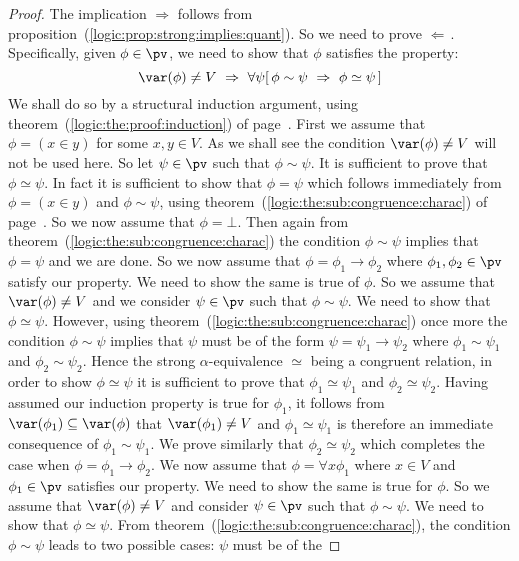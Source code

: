 \noindent
\begin{proof}
The implication $\Rightarrow$ follows from
proposition~(\ref{logic:prop:strong:implies:quant}). So we need to
prove $\Leftarrow$\,. Specifically, given $\phi\in\pv$, we need to
show that $\phi$ satisfies the property:
    \[
    \var(\phi)\neq V\ \Rightarrow\ \forall\psi[\,\phi\sim\psi\
    \Rightarrow\ \phi\simeq\psi\,]
    \]
We shall do so by a structural induction argument, using
theorem~(\ref{logic:the:proof:induction}) of
page~\pageref{logic:the:proof:induction}. First we assume that
$\phi=(x\in y)$ for some $x,y\in V$. As we shall see the condition
$\var(\phi)\neq V$ will not be used here. So let $\psi\in\pv$ such
that $\phi\sim\psi$. It is sufficient to prove that
$\phi\simeq\psi$. In fact it is sufficient to show that $\phi=\psi$
which follows immediately from $\phi=(x\in y)$ and $\phi\sim\psi$,
using theorem~(\ref{logic:the:sub:congruence:charac}) of
page~\pageref{logic:the:sub:congruence:charac}. So we now assume
that $\phi=\bot$. Then again from
theorem~(\ref{logic:the:sub:congruence:charac}) the condition
$\phi\sim\psi$ implies that $\phi=\psi$ and we are done. So we now
assume that $\phi=\phi_{1}\to\phi_{2}$ where
$\phi_{1},\phi_{2}\in\pv$ satisfy our property. We need to show the
same is true of $\phi$. So we assume that $\var(\phi)\neq V$ and we
consider $\psi\in\pv$ such that $\phi\sim\psi$. We need to show that
$\phi\simeq\psi$. However, using
theorem~(\ref{logic:the:sub:congruence:charac}) once more the
condition $\phi\sim\psi$ implies that $\psi$ must be of the form
$\psi=\psi_{1}\to\psi_{2}$ where $\phi_{1}\sim\psi_{1}$ and
$\phi_{2}\sim\psi_{2}$. Hence the strong $\alpha$-equivalence $\simeq$ being
a congruent relation, in order to show $\phi\simeq\psi$ it is
sufficient to prove that $\phi_{1}\simeq\psi_{1}$ and
$\phi_{2}\simeq\psi_{2}$. Having assumed our induction property is
true for $\phi_{1}$, it follows from
$\var(\phi_{1})\subseteq\var(\phi)$ that $\var(\phi_{1})\neq V$ and
$\phi_{1}\simeq\psi_{1}$ is therefore an immediate consequence of
$\phi_{1}\sim\psi_{1}$. We prove similarly that
$\phi_{2}\simeq\psi_{2}$ which completes the case when
$\phi=\phi_{1}\to\phi_{2}$. We now assume that $\phi=\forall
x\phi_{1}$ where $x\in V$ and $\phi_{1}\in\pv$ satisfies our
property. We need to show the same is true for $\phi$. So we assume
that $\var(\phi)\neq V$ and consider $\psi\in\pv$ such that
$\phi\sim\psi$. We need to show that $\phi\simeq\psi$. From
theorem~(\ref{logic:the:sub:congruence:charac}), the condition
$\phi\sim\psi$ leads to two possible cases: $\psi$ must be of the

\end{proof}
